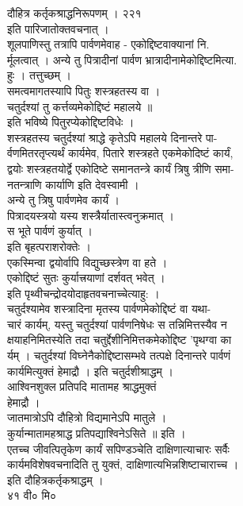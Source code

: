 \documentclass[11pt, openany]{book}
\begin{document}
{{{{{{{{{{{{{{{{{{{{{{{{{{{{{{{{{{{{{{{{ दौहित्र कर्तृकश्राद्धनिरूपणम् । २२१\\
इति पारिजातोक्तवचनात् ।\\
शूलपाणिस्तु तत्रापि पार्वणमेवाह - एकोद्दिष्टवाक्यानां नि.\\
र्मूलत्वात् । अन्ये तु पित्रादीनां पार्वण
भ्रात्रादीनामेकोद्दिष्टमित्या.\\
हुः । तत्तुच्छम् ।\\
समत्वमागतस्यापि पितुः शस्त्रहतस्य वा ।\\
चतुर्दश्यां तु कर्त्तव्यमेकोद्दिष्टं महालये ॥\\
इति भविष्ये पितुरप्येकोद्दिष्टविधेः ।\\
शस्त्रहतस्य चतुर्दश्यां श्राद्धे कृतेऽपि महालये दिनान्तरे पा-\\
र्वणमितरतृप्त्यर्थं कार्यमेव, पितारे शस्त्रहते एकमेकोदिष्टं
}{कार्यं}{,\\
द्वयोः शस्त्रहतयोर्द्वे एकोदिष्टे समानतन्त्रे कार्यं त्रिषु त्रीणि
समा-\\
नतन्त्राणि कार्याणि इति देवस्वामी ।\\
अन्ये तु त्रिषु पार्वणमेव }{कार्यं}{ ।\\
पित्रादयस्त्रयो यस्य शस्त्रैर्यातास्त्वनुक्रमात् ।\\
स भूते पार्वणं कुर्यात् ।\\
इति बृहत्पराशरोक्तेः ।\\
एकस्मिन्वा द्वयोर्वापि विद्युच्छस्त्रेण वा हते ।\\
एकोद्दिष्टं सुतः कुर्यात्त्रयाणां दर्शवत् भवेत् ।\\
इति पृथ्वीचन्द्रोदयोदाहृतवचनाच्चेत्याहु: ।\\
चतुर्दश्यामेव शस्त्रादिना मृतस्य पार्वणमेकोद्दिष्टं वा यथा-\\
चारं कार्यम्, यस्तु चतुर्दश्यां पार्वणनिषेधः स तन्निमित्तस्यैव न\\
क्षयाहनिमितस्येति तदा चतुर्द्देशीनिमित्तकमेकोद्दिष्ट 'पृथग्वा का\\
र्यम् । चतुर्दश्यां विघ्नेनैकोद्दिष्टासम्भवे तत्पक्षे दिनान्तरे
पार्वणं\\
कार्यमित्युक्तं हेमाद्रौ । इति चतुर्दशीश्राद्धम् ।\\
आश्विनशुक्ल प्रतिपदि मातामह श्राद्धमुक्तं\\
हेमाद्रौ ।\\
जातमात्रोऽपि दौहित्रो विद्यमानेऽपि मातुले ।\\
कुर्यान्मातामहश्राद्ध प्रतिपद्याश्विनेऽसिते ॥ इति ।\\
एतच्च जीवत्पितृकेण }{कार्यं}{ सपिण्डञ्चेति दाक्षिणात्याचारः सर्वैः\\
कार्यमविशेषवचनादिति तु युक्तं, दाक्षिणात्यभिन्नशिष्टाचाराच्च ।\\
इति दौहित्रकर्तृकश्राद्धम् ।\\
४१ वी० मि०\\


}}}}}}}}}}}}}}}}}}}}}}}}}}}}}}}}}}}}}}}}
\end{document}

